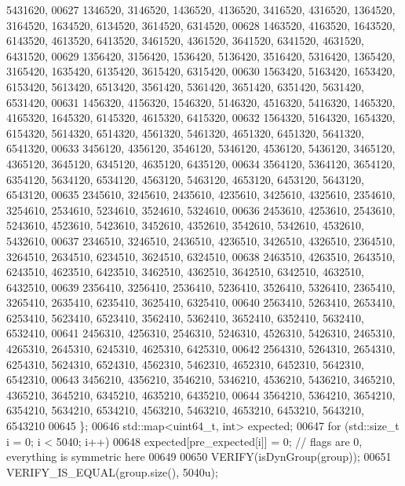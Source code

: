 \begin{DoxyCode}
      5431620,
00627       1346520, 3146520, 1436520, 4136520, 3416520, 4316520, 1364520, 3164520, 1634520, 6134520, 3614520, 
      6314520,
00628       1463520, 4163520, 1643520, 6143520, 4613520, 6413520, 3461520, 4361520, 3641520, 6341520, 4631520, 
      6431520,
00629       1356420, 3156420, 1536420, 5136420, 3516420, 5316420, 1365420, 3165420, 1635420, 6135420, 3615420, 
      6315420,
00630       1563420, 5163420, 1653420, 6153420, 5613420, 6513420, 3561420, 5361420, 3651420, 6351420, 5631420, 
      6531420,
00631       1456320, 4156320, 1546320, 5146320, 4516320, 5416320, 1465320, 4165320, 1645320, 6145320, 4615320, 
      6415320,
00632       1564320, 5164320, 1654320, 6154320, 5614320, 6514320, 4561320, 5461320, 4651320, 6451320, 5641320, 
      6541320,
00633       3456120, 4356120, 3546120, 5346120, 4536120, 5436120, 3465120, 4365120, 3645120, 6345120, 4635120, 
      6435120,
00634       3564120, 5364120, 3654120, 6354120, 5634120, 6534120, 4563120, 5463120, 4653120, 6453120, 5643120, 
      6543120,
00635       2345610, 3245610, 2435610, 4235610, 3425610, 4325610, 2354610, 3254610, 2534610, 5234610, 3524610, 
      5324610,
00636       2453610, 4253610, 2543610, 5243610, 4523610, 5423610, 3452610, 4352610, 3542610, 5342610, 4532610, 
      5432610,
00637       2346510, 3246510, 2436510, 4236510, 3426510, 4326510, 2364510, 3264510, 2634510, 6234510, 3624510, 
      6324510,
00638       2463510, 4263510, 2643510, 6243510, 4623510, 6423510, 3462510, 4362510, 3642510, 6342510, 4632510, 
      6432510,
00639       2356410, 3256410, 2536410, 5236410, 3526410, 5326410, 2365410, 3265410, 2635410, 6235410, 3625410, 
      6325410,
00640       2563410, 5263410, 2653410, 6253410, 5623410, 6523410, 3562410, 5362410, 3652410, 6352410, 5632410, 
      6532410,
00641       2456310, 4256310, 2546310, 5246310, 4526310, 5426310, 2465310, 4265310, 2645310, 6245310, 4625310, 
      6425310,
00642       2564310, 5264310, 2654310, 6254310, 5624310, 6524310, 4562310, 5462310, 4652310, 6452310, 5642310, 
      6542310,
00643       3456210, 4356210, 3546210, 5346210, 4536210, 5436210, 3465210, 4365210, 3645210, 6345210, 4635210, 
      6435210,
00644       3564210, 5364210, 3654210, 6354210, 5634210, 6534210, 4563210, 5463210, 4653210, 6453210, 5643210, 
      6543210
00645     \};
00646     std::map<uint64\_t, int> expected;
00647     \textcolor{keywordflow}{for} (std::size\_t i = 0; i < 5040; i++)
00648       expected[pre\_expected[i]] = 0; \textcolor{comment}{// flags are 0, everything is symmetric here}
00649 
00650     VERIFY(isDynGroup(group));
00651     VERIFY\_IS\_EQUAL(group.size(), 5040u);

\end{DoxyCode}
